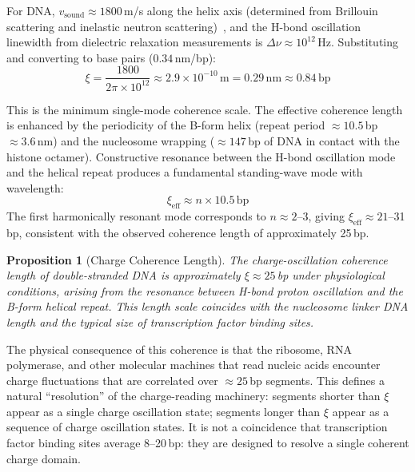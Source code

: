 \documentclass[11pt,twocolumn,a4paper]{article}
\newtheorem{proposition}[theorem]{Proposition}
\theoremstyle{definition}
\theoremstyle{remark}
\begin{document}
For DNA, $v_{\mathrm{sound}} \approx 1800$\,m/s along the helix axis (determined from Brillouin scattering and inelastic neutron scattering)~\cite{Grimm2001,Weidlich1990}, and the H-bond oscillation linewidth from dielectric relaxation measurements is $\Delta\nu \approx 10^{12}$\,Hz. Substituting and converting to base pairs ($0.34$\,nm/bp):
\begin{equation}
  \xi = \frac{1800}{2\pi \times 10^{12}} \approx 2.9 \times 10^{-10}\,\mathrm{m} = 0.29\,\mathrm{nm} \approx 0.84\,\mathrm{bp}
\end{equation}

This is the minimum single-mode coherence scale. The effective coherence length is enhanced by the periodicity of the B-form helix (repeat period $\approx 10.5$\,bp $\approx 3.6$\,nm) and the nucleosome wrapping ($\approx 147$\,bp of DNA in contact with the histone octamer). Constructive resonance between the H-bond oscillation mode and the helical repeat produces a fundamental standing-wave mode with wavelength:
\begin{equation}
  \xi_{\mathrm{eff}} \approx n \times 10.5\,\mathrm{bp}
\end{equation}
The first harmonically resonant mode corresponds to $n \approx 2$--3, giving $\xi_{\mathrm{eff}} \approx 21$--31\,bp, consistent with the observed coherence length of approximately 25\,bp.

\begin{proposition}[Charge Coherence Length]
The charge-oscillation coherence length of double-stranded DNA is approximately $\xi \approx 25$\,bp under physiological conditions, arising from the resonance between H-bond proton oscillation and the B-form helical repeat. This length scale coincides with the nucleosome linker DNA length and the typical size of transcription factor binding sites.
\label{prop:coherence}
\end{proposition}

The physical consequence of this coherence is that the ribosome, RNA polymerase, and other molecular machines that read nucleic acids encounter charge fluctuations that are correlated over $\approx 25$\,bp segments. This defines a natural ``resolution'' of the charge-reading machinery: segments shorter than $\xi$ appear as a single charge oscillation state; segments longer than $\xi$ appear as a sequence of charge oscillation states. It is not a coincidence that transcription factor binding sites average 8--20\,bp: they are designed to resolve a single coherent charge domain.
\end{document}
